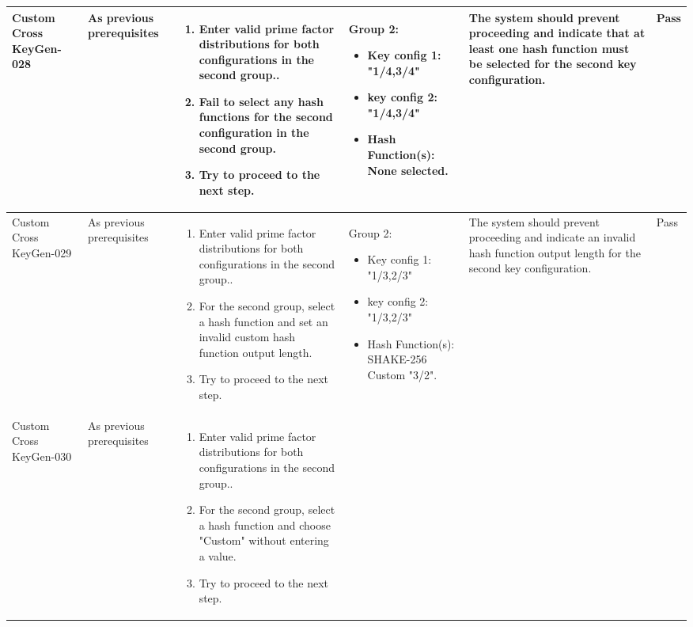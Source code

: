 \documentclass[]{final_report}
\theoremstyle{definition}
\begin{document}
\begin{longtable}{|p{1.5cm}|p{2.5cm}|p{3.5cm}|p{2.5cm}|p{3cm}|p{2cm}|}
  \hline
  Custom
  Cross
  KeyGen-028 & As previous prerequisites &
  \begin{enumerate}
    \item Enter valid prime factor distributions for both configurations in the second group..
    \item Fail to select any hash functions for the second configuration in the second group.
    \item Try to proceed to the next step.
  \end{enumerate} & 
        Group 2: 
    \begin{itemize}
 \item Key config 1: "1/4,3/4"
 \item key config 2:  "1/4,3/4"
 \item Hash Function(s): None selected.
    \end{itemize}
   & The system should prevent proceeding and indicate that at least one hash function must be selected for the second key configuration. & Pass \\
  \hline
  Custom
  Cross
  KeyGen-029 & As previous prerequisites &
  \begin{enumerate}
    \item Enter valid prime factor distributions for both configurations in the second group..
    \item For the second group, select a hash function and set an invalid custom hash function output length.
    \item Try to proceed to the next step.
  \end{enumerate} & 
    Group 2: 
    \begin{itemize}
 \item Key config 1: "1/3,2/3"
 \item key config 2:  "1/3,2/3"
 \item Hash Function(s): SHAKE-256 Custom "3/2".
    \end{itemize}
 & The system should prevent proceeding and indicate an invalid hash function output length for the second key configuration. & Pass \\
  \hline
  Custom
  Cross
  KeyGen-030 & As previous prerequisites &
  \begin{enumerate}
    \item Enter valid prime factor distributions for both configurations in the second group..
    \item For the second group, select a hash function and choose "Custom" without entering a value.
    \item Try to proceed to the next step.

\end{enumerate}
\end{longtable}
\end{document}
